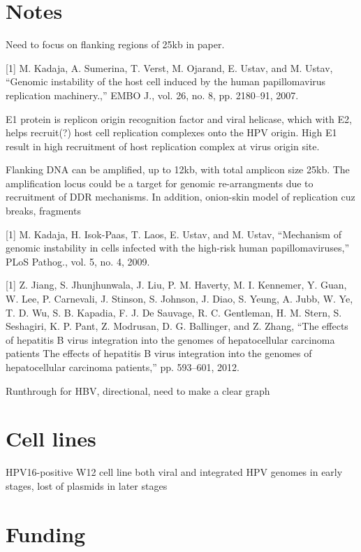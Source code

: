 \documentclass{bioinfo}
\begin{document}
\section{Notes}

Need to focus on flanking regions of 25kb in paper.


[1] M. Kadaja, A. Sumerina, T. Verst, M. Ojarand, E. Ustav, and M. Ustav, “Genomic instability of the host cell induced by the human papillomavirus replication machinery.,” EMBO J., vol. 26, no. 8, pp. 2180–91, 2007.

E1 protein is replicon origin recognition factor and viral helicase, which with E2, helps recruit(?) host cell replication complexes onto the HPV origin.  High E1 result in high recruitment of host replication complex at virus origin site.

Flanking DNA can be amplified, up to 12kb, with total amplicon size 25kb.  The amplification locus could be a target for genomic re-arrangments due to recruitment of DDR mechanisms.  In addition, onion-skin model of replication cuz breaks, fragments

[1] M. Kadaja, H. Isok-Paas, T. Laos, E. Ustav, and M. Ustav, “Mechanism of genomic instability in cells infected with the high-risk human papillomaviruses,” PLoS Pathog., vol. 5, no. 4, 2009.



[1] Z. Jiang, S. Jhunjhunwala, J. Liu, P. M. Haverty, M. I. Kennemer, Y. Guan, W. Lee, P. Carnevali, J. Stinson, S. Johnson, J. Diao, S. Yeung, A. Jubb, W. Ye, T. D. Wu, S. B. Kapadia, F. J. De Sauvage, R. C. Gentleman, H. M. Stern, S. Seshagiri, K. P. Pant, Z. Modrusan, D. G. Ballinger, and Z. Zhang, “The effects of hepatitis B virus integration into the genomes of hepatocellular carcinoma patients The effects of hepatitis B virus integration into the genomes of hepatocellular carcinoma patients,” pp. 593–601, 2012.

Runthrough for HBV, directional, need to make a clear graph
\section{Cell lines}
HPV16-positive W12 cell line both viral and integrated HPV genomes in early stages, lost of plasmids in later stages


\section*{Funding}


%
%
%
%
%
%
%
%
%



\end{document}
